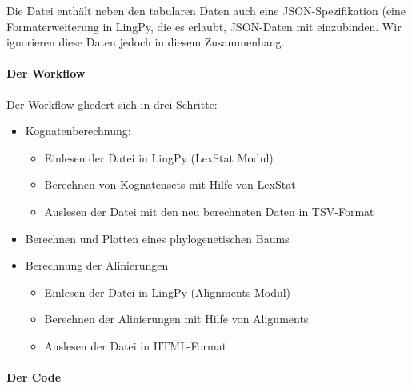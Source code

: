 Die Datei enthält neben den tabularen Daten auch eine JSON-Spezifikation
(eine Formaterweiterung in LingPy, die es erlaubt, JSON-Daten mit
einzubinden. Wir ignorieren diese Daten jedoch in diesem Zusammenhang.





\paragraph{Der Workflow}

Der Workflow gliedert sich in drei Schritte:

\begin{itemize}
\itemsep1pt\parskip0pt
\item
  Kognatenberechnung:

  \begin{itemize}
  \itemsep1pt\parskip0pt
  \item
    Einlesen der Datei in LingPy (LexStat Modul)
  \item
    Berechnen von Kognatensets mit Hilfe von LexStat
  \item
    Auslesen der Datei mit den neu berechneten Daten in TSV-Format
  \end{itemize}
\item
  Berechnen und Plotten eines phylogenetischen Baums
\item
  Berechnung der Alinierungen

  \begin{itemize}
  \itemsep1pt\parskip0pt
  \item
    Einlesen der Datei in LingPy (Alignments Modul)
  \item
    Berechnen der Alinierungen mit Hilfe von Alignments
  \item
    Auslesen der Datei in HTML-Format
  \end{itemize}
\end{itemize}





\paragraph{Der Code}

